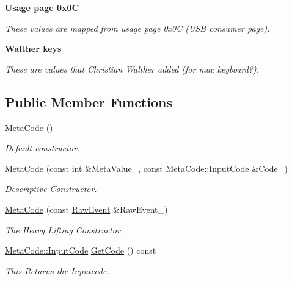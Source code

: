 \begin{Indent}{\bf Usage page 0x0C}\par
{\em \label{_amgrpd4ef4ec32b3df3fcedf5c699f77b38f1}
 These values are mapped from usage page 0x0C (USB consumer page). }\end{Indent}
\begin{Indent}{\bf Walther keys}\par
{\em \label{_amgrpba1ec37238b609de347cf253fe3e047e}
 These are values that Christian Walther added (for mac keyboard?). }\end{Indent}
\subsection*{Public Member Functions}
\begin{DoxyCompactItemize}
\item 
\hyperlink{classphys_1_1MetaCode_ae2c80c84f924ddfd880f46ffe6a1746e}{MetaCode} ()
\begin{DoxyCompactList}\small\item\em Default constructor. \item\end{DoxyCompactList}\item 
\hyperlink{classphys_1_1MetaCode_a590e6b767952e278b72ff71eddf369d4}{MetaCode} (const int \&MetaValue\_\-, const \hyperlink{classphys_1_1MetaCode_a3e501cbb5bf0f6f1fdb7211465bda8d8}{MetaCode::InputCode} \&Code\_\-)
\begin{DoxyCompactList}\small\item\em Descriptive Constructor. \item\end{DoxyCompactList}\item 
\hyperlink{classphys_1_1MetaCode_ad9a618b5cc6f9d0cf0a4bc4f47bf98e8}{MetaCode} (const \hyperlink{namespacephys_a8126d26e4507e66d09876988bb941fd4}{RawEvent} \&RawEvent\_\-)
\begin{DoxyCompactList}\small\item\em The Heavy Lifting Constructor. \item\end{DoxyCompactList}\item 
\hyperlink{classphys_1_1MetaCode_a3e501cbb5bf0f6f1fdb7211465bda8d8}{MetaCode::InputCode} \hyperlink{classphys_1_1MetaCode_a5835a05391cbb5a3dc83534a7bcf87d3}{GetCode} () const 
\begin{DoxyCompactList}\small\item\em This Returns the Inputcode. \item\end{DoxyCompactList}\item 

\end{DoxyCompactItemize}
